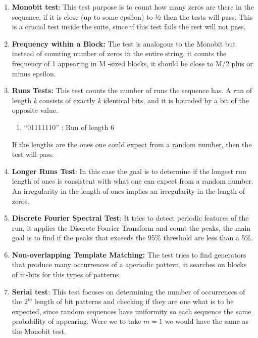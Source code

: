\begin{enumerate}
\item  \textbf{Monobit test}: This test purpose is to count how many zeros are there in the sequence, if it is close (up to some epsilon) to ½ then the tests will pass. This is a crucial test inside the suite, since if this test fails the rest will not pass.

\item  \textbf{Frequency within a Block: }The test is analogous to the Monobit but instead of counting number of zeros in the entire string, it counts the frequency of 1 appearing in M -sized blocks, it should be close to M/2 plus or minus epsilon. 

\item  \textbf{Runs Tests: }This test counts the number of runs the sequence has. A run of length \textit{k} consists of exactly \textit{k} identical bits, and it is bounded by a bit of the opposite value. 

\begin{enumerate}
\item  ``01111110'' : Run of length 6
\end{enumerate}


If the lengths are the ones one could expect from a random number, then the test will pass.


\item  \textbf{Longer Runs Test}: In this case the goal is to determine if the longest run length of ones is consistent with what one can expect from a random number.  An irregularity in the length of ones implies an irregularity in the length of zeros.

\item  \textbf{Discrete Fourier Spectral Test}: It tries to detect periodic features of the run, it applies the Discrete Fourier Transform and count the peaks, the main goal is to find if the peaks that exceeds the 95\% threshold are less than a 5\%.

\item  \textbf{Non-overlapping Template Matching:} The test tries to find generators that produce many occurrences of a aperiodic pattern, it searches on blocks of m-bits for this types of patterns.

\item \textbf{ Serial test}: This test focuses on determining the number of occurrences of the $2^m$ length of bit patterns and checking if they are one what is to be expected, since random sequences have uniformity so each sequence the same probability of appearing. Were we to take $m=1$ we would have the same as the Monobit test.


\end{enumerate}
